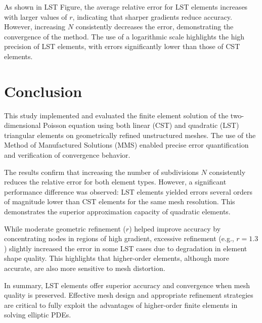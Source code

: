 \documentclass[12pt]{article}
\begin{document}
\vspace{0.3cm}
\noindent
As shown in LST Figure, the average relative error for LST elements increases with larger values of $r$, indicating that sharper gradients reduce accuracy. However, increasing $N$ consistently decreases the error, demonstrating the convergence of the method. The use of a logarithmic scale highlights the high precision of LST elements, with errors significantly lower than those of CST elements.



\newpage
\section{Conclusion}

This study implemented and evaluated the finite element solution of the two-dimensional Poisson equation using both linear (CST) and quadratic (LST) triangular elements on geometrically refined unstructured meshes. The use of the Method of Manufactured Solutions (MMS) enabled precise error quantification and verification of convergence behavior.

The results confirm that increasing the number of subdivisions $N$ consistently reduces the relative error for both element types. However, a significant performance difference was observed: LST elements yielded errors several orders of magnitude lower than CST elements for the same mesh resolution. This demonstrates the superior approximation capacity of quadratic elements.

While moderate geometric refinement ($r$) helped improve accuracy by concentrating nodes in regions of high gradient, excessive refinement (e.g., $r = 1.3$) slightly increased the error in some LST cases due to degradation in element shape quality. This highlights that higher-order elements, although more accurate, are also more sensitive to mesh distortion.

In summary, LST elements offer superior accuracy and convergence when mesh quality is preserved. Effective mesh design and appropriate refinement strategies are critical to fully exploit the advantages of higher-order finite elements in solving elliptic PDEs.
\end{document}
